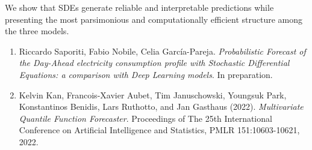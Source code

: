 \begin{talk}
We show that SDEs generate reliable and interpretable predictions while presenting the most parsimonious and computationally efficient structure among the three models.


\medskip

 

\begin{enumerate}
    \item[{[1]}] Riccardo Saporiti, Fabio Nobile, Celia Garc\'ia-Pareja. {\it Probabilistic Forecast of the Day-Ahead electricity consumption profile with Stochastic Differential Equations: a comparison with Deep Learning models}. In preparation.

 \item[{[2]}] Kelvin Kan, Francois-Xavier Aubet, Tim Januschowski, Youngsuk Park, Konstantinos Benidis, Lars Ruthotto, and Jan Gasthaus (2022). {\it Multivariate Quantile Function Forecaster}. Proceedings of The 25th International Conference on Artificial Intelligence and Statistics, PMLR 151:10603-10621, 2022.
 
\end{enumerate}
 
\end{talk}
